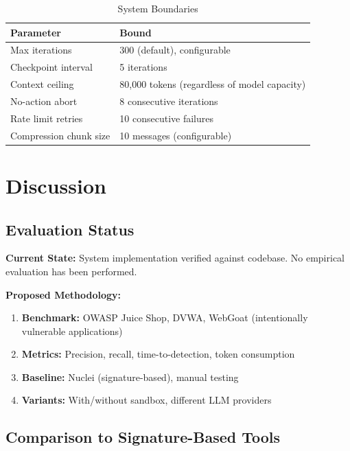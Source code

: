 \documentclass[11pt,a4paper]{article}
\theoremstyle{definition}
\begin{document}
\begin{table}[H]
\centering
\caption{System Boundaries}
\label{tab:boundaries}
\begin{tabularx}{\textwidth}{@{}l X@{}}
\toprule
\textbf{Parameter} & \textbf{Bound} \\
\midrule
Max iterations & 300 (default), configurable \\
Checkpoint interval & 5 iterations \\
Context ceiling & 80,000 tokens (regardless of model capacity) \\
No-action abort & 8 consecutive iterations \\
Rate limit retries & 10 consecutive failures \\
Compression chunk size & 10 messages (configurable) \\
\bottomrule
\end{tabularx}
\end{table}

\section{Discussion}
\label{sec:discussion}

\subsection{Evaluation Status}

\textbf{Current State:} System implementation verified against codebase. No empirical evaluation has been performed.

\textbf{Proposed Methodology:}
\begin{enumerate}[leftmargin=*]
    \item \textbf{Benchmark:} OWASP Juice Shop, DVWA, WebGoat (intentionally vulnerable applications)
    \item \textbf{Metrics:} Precision, recall, time-to-detection, token consumption
    \item \textbf{Baseline:} Nuclei (signature-based), manual testing
    \item \textbf{Variants:} With/without sandbox, different LLM providers
\end{enumerate}

\subsection{Comparison to Signature-Based Tools}
\end{document}
